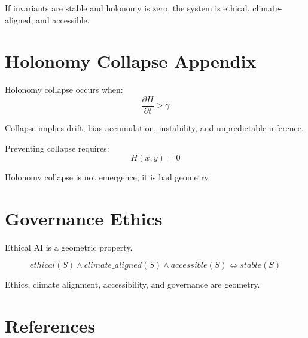 \documentclass[11pt]{article}
\begin{document}
If invariants are stable and holonomy is zero, the system is ethical, climate-aligned, and accessible.

\section{Holonomy Collapse Appendix}

Holonomy collapse occurs when:
\begin{equation}
\frac{\partial H}{\partial t} > \gamma
\end{equation}

Collapse implies drift, bias accumulation, instability, and unpredictable inference.

Preventing collapse requires:
\begin{equation}
H(x,y) = 0
\end{equation}

Holonomy collapse is not emergence; it is bad geometry.

\section{Governance Ethics}

Ethical AI is a geometric property.

\begin{equation}
ethical(S) \land climate\_aligned(S) \land accessible(S) \iff stable(S)
\end{equation}

Ethics, climate alignment, accessibility, and governance are geometry.

\section*{References}
\end{document}

